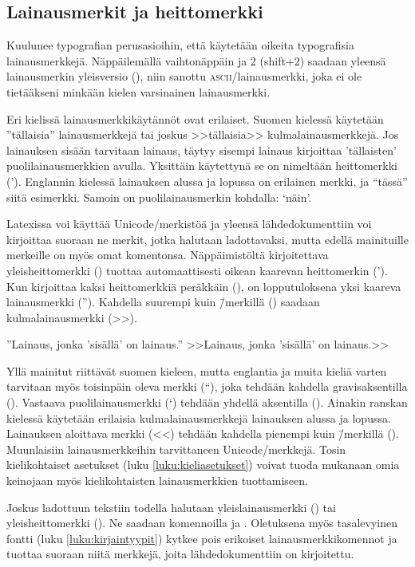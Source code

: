 \subsection{Lainausmerkit ja heittomerkki}

Kuulunee typografian perus\-asioihin, että käytetään oikeita
typografisia lainausmerkkejä. Näppäilemällä vaihtonäppäin ja 2 (shift+2)
saadaan yleensä lainausmerkin yleisversio (\textquotedbl), niin sanottu
\textsc{ascii}\-/lainausmerkki, joka ei ole tietääkseni minkään kielen
varsinainen lainausmerkki.

Eri kielissä lainausmerkkikäytännöt ovat erilaiset. Suomen kielessä
käytetään ''tällaisia'' lainausmerkkejä tai joskus >>tällaisia>>
kulmalainausmerkkejä. Jos lainauksen sisään tarvitaan lainaus, täytyy
sisempi lainaus kirjoittaa 'tällaisten' puolilainausmerkkien avulla.
Yksittäin käytettynä se on nimeltään heittomerkki ('). Englannin
kielessä lainauksen alussa ja lopussa on erilainen merkki, ja ``tässä''
siitä esimerkki. Samoin on puolilainausmerkin kohdalla: `näin'.

Latexissa voi käyttää Unicode\-/merkistöä ja yleensä lähdedokumenttiin
voi kirjoittaa suoraan ne merkit, jotka halutaan ladottavaksi, mutta
edellä mainituille merkeille on myös omat komentonsa. Näppäimistöltä
kirjoitettava yleisheittomerkki () tuottaa automaattisesti
oikean kaarevan heittomerkin ('). Kun kirjoittaa kaksi heittomerkkiä
peräkkäin (), on lopputuloksena yksi kaareva lainausmerkki
(''). Kahdella suurempi kuin \=/merkillä (\koodi{>>}) saadaan
kulmalainausmerkki (>>).

\begin{koodilohkosis}
  ''Lainaus, jonka 'sisällä' on lainaus.''
  >>Lainaus, jonka 'sisällä' on lainaus.>>
\end{koodilohkosis}

Yllä mainitut riittävät suomen kieleen, mutta englantia ja muita kieliä
varten tarvitaan myös toisinpäin oleva merkki (``), joka tehdään
kahdella gra\-vis\-ak\-sen\-til\-la (). Vastaava
puolilainausmerkki (`) tehdään yhdellä aksentilla (). Ainakin
ranskan kielessä käytetään erilaisia kulmalainausmerkkejä lainauksen
alussa ja lopussa. Lainauksen aloittava merkki (<<) tehdään kahdella
pienempi kuin \=/merkillä (\koodi{<<}). Muunlaisiin lainausmerkkeihin
tarvittaneen Unicode\-/merkkejä. Tosin kielikohtaiset asetukset (luku
\ref{luku:kieliasetukset}) voivat tuoda mukanaan omia keinojaan myös
kielikohtaisten lainausmerkkien tuottamiseen.

Joskus ladottuun tekstiin todella halutaan yleislainausmerkki
(\textquotedbl) tai yleisheittomerkki (\textquotesingle). Ne saadaan
komennoilla  ja .
Oletuksena myös tasalevyinen fontti (luku \ref{luku:kirjaintyypit})
kytkee pois erikoiset lainausmerkkikomennot ja tuottaa suoraan niitä
merkkejä, joita lähdedokumenttiin on kirjoitettu.

